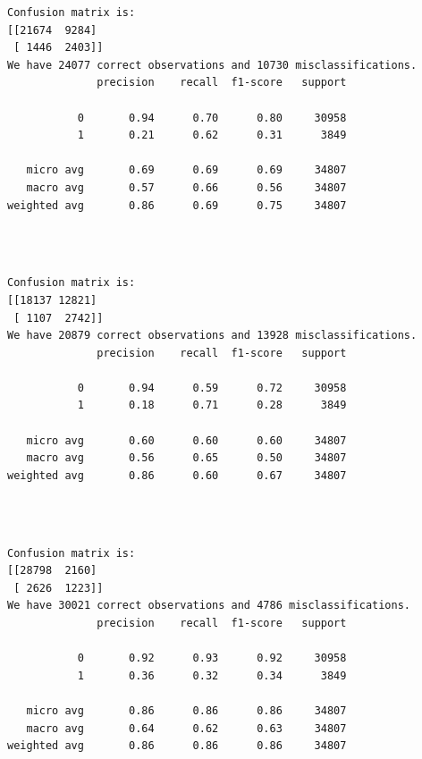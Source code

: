 \documentclass[8pt,onecolumn,aps,pra]{revtex4-1}
\begin{document}
    \begin{Verbatim}[commandchars=\\\{\}]
Confusion matrix is:
[[21674  9284]
 [ 1446  2403]]
We have 24077 correct observations and 10730 misclassifications.
              precision    recall  f1-score   support

           0       0.94      0.70      0.80     30958
           1       0.21      0.62      0.31      3849

   micro avg       0.69      0.69      0.69     34807
   macro avg       0.57      0.66      0.56     34807
weighted avg       0.86      0.69      0.75     34807


    \end{Verbatim}

    \begin{center}
    \end{center}
    { \hspace*{\fill} \\}
    
    \begin{Verbatim}[commandchars=\\\{\}]
Confusion matrix is:
[[18137 12821]
 [ 1107  2742]]
We have 20879 correct observations and 13928 misclassifications.
              precision    recall  f1-score   support

           0       0.94      0.59      0.72     30958
           1       0.18      0.71      0.28      3849

   micro avg       0.60      0.60      0.60     34807
   macro avg       0.56      0.65      0.50     34807
weighted avg       0.86      0.60      0.67     34807


    \end{Verbatim}

    \begin{center}
    \end{center}
    { \hspace*{\fill} \\}
    
    \begin{Verbatim}[commandchars=\\\{\}]
Confusion matrix is:
[[28798  2160]
 [ 2626  1223]]
We have 30021 correct observations and 4786 misclassifications.
              precision    recall  f1-score   support

           0       0.92      0.93      0.92     30958
           1       0.36      0.32      0.34      3849

   micro avg       0.86      0.86      0.86     34807
   macro avg       0.64      0.62      0.63     34807
weighted avg       0.86      0.86      0.86     34807


    \end{Verbatim}
\end{document}
